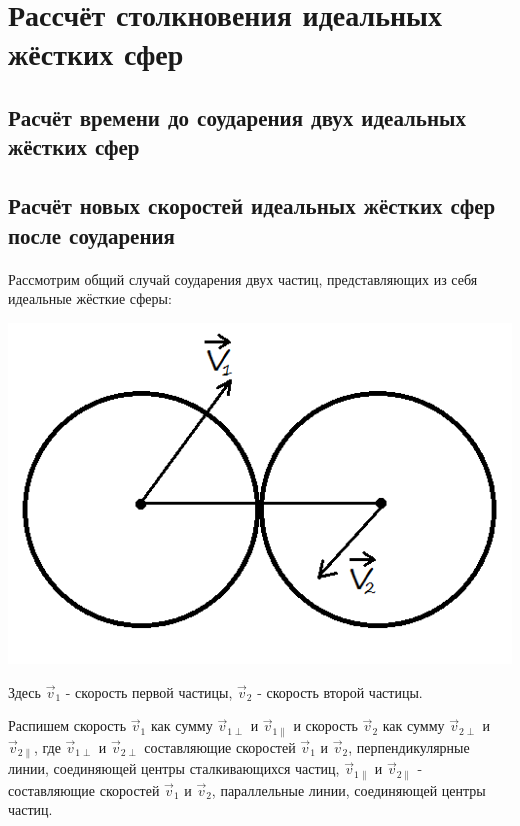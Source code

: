 \documentclass{article}
\begin{document}
\newpage
\section{Рассчёт столкновения идеальных жёстких сфер}

\subsection{Расчёт времени до соударения двух идеальных жёстких сфер}


\subsection{Расчёт новых скоростей идеальных жёстких сфер после соударения}
    \paragraph{}Рассмотрим общий случай соударения двух частиц, представляющих из себя идеальные жёсткие сферы:

\begin{center}
\includegraphics[scale=0.3]{collission_of_two_particles.png}
\end{center}

Здесь $ \vec{v}_1 $ - скорость первой частицы, $ \vec{v}_2 $ - скорость второй частицы.

Распишем скорость $ \vec{v}_1 $ как сумму $ \vec{v}_{1\perp} $ и $ \vec{v}_{1\parallel} $ и скорость $ \vec{v}_2 $ как сумму $ \vec{v}_{2\perp} $ и $ \vec{v}_{2\parallel} $, где $ \vec{v}_{1\perp} $ и $ \vec{v}_{2\perp} $ составляющие скоростей $ \vec{v}_1 $ и $ \vec{v}_2 $, перпендикулярные линии, соединяющей центры сталкивающихся частиц, $ \vec{v}_{1\parallel} $ и $ \vec{v}_{2\parallel} $ - составляющие скоростей $ \vec{v}_1 $ и $ \vec{v}_2 $, параллельные линии, соединяющей центры частиц.
\end{document}
